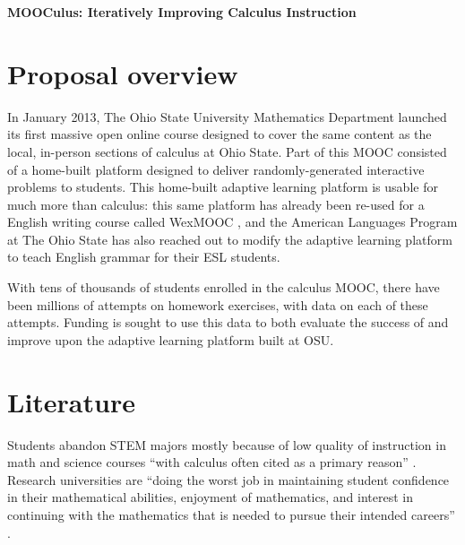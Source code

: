 \documentclass[12pt]{article}
\begin{document}
\begin{center}
  \textbf{MOOCulus: Iteratively Improving Calculus Instruction}
\end{center}

% 

\section{Proposal overview}

In January 2013, The Ohio State University Mathematics Department
launched its first massive open online course designed to cover the
same content as the local, in-person sections of calculus at Ohio
State.  Part of this MOOC consisted of a home-built platform designed
to deliver randomly-generated interactive problems to students.  This
home-built adaptive learning platform is usable for much more than
calculus: this same platform has already been re-used for a English
writing course called WexMOOC \parencite{gates-foundation-grant}, and
the American Languages Program at The Ohio State has also reached out
to modify the adaptive learning platform to teach English grammar for
their ESL students.

With tens of thousands of students enrolled in the calculus MOOC,
there have been millions of attempts on homework exercises, with data
on each of these attempts.  Funding is sought to use this data to both
evaluate the success of and improve upon the adaptive learning
platform built at OSU.

\section{Literature}

Students abandon STEM majors mostly because of low quality of
instruction in math and science courses ``with calculus often cited as
a primary reason'' \parencite{calculus-programs}.  Research
universities are ``doing the worst job in maintaining student
confidence in their mathematical abilities, enjoyment of mathematics,
and interest in continuing with the mathematics that is needed to
pursue their intended careers'' \cite{calculus-students}.
\end{document}
